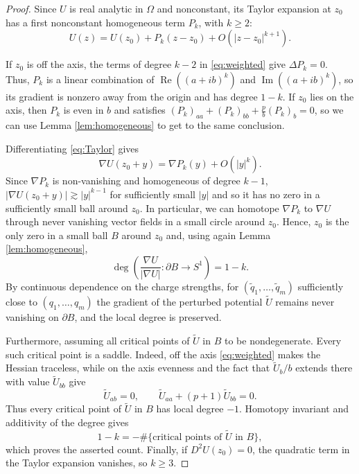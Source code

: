 \documentclass[leqno,11pt]{amsart}
\numberwithin{equation}{section}
\DeclareMathOperator\degmap{deg}
\theoremstyle{definition}
\begin{document}
	\begin{proof}
		Since $U$ is real analytic in $\Omega$ and nonconstant, its Taylor expansion at $z_0$ has a first nonconstant homogeneous term $P_k$, with $k\geq2$:
		\begin{equation}\label{eq:Taylor}
			U(z)=U(z_0)+P_k(z-z_0)+O(|z-z_0|^{k+1}).
		\end{equation}
		
		If $z_0$ is off the axis, the terms of degree $k-2$ in \eqref{eq:weighted} give $\Delta P_k=0$. Thus, $P_k$ is a linear combination of $\operatorname{Re}((a+ib)^k)$ and $\operatorname{Im}((a+ib)^k)$, so its gradient is nonzero away from the origin and has degree $1-k$. If $z_0$ lies on the axis, then $P_k$ is even in $b$ and satisfies $(P_k)_{aa}+(P_k)_{bb}+\frac{p}{b}(P_k)_b=0$, so we can use
		Lemma \ref{lem:homogeneous} to get to the same conclusion.
		
		Differentiating \eqref{eq:Taylor} gives
		\[
		\nabla U(z_0+y)=\nabla P_k(y)+O(|y|^k).
		\]
		Since $\nabla P_k$ is non-vanishing and homogeneous of degree $k-1$, $|\nabla U(z_0+y)|\gtrsim |y|^{k-1}$ for sufficiently small $|y|$ and so it has no zero in a sufficiently small ball around $z_0$. In particular, we can homotope $\nabla P_k$ to $\nabla U$ through never vanishing vector fields in a small circle around $z_0$. Hence, $z_0$ is the only zero in a small ball $B$ around $z_0$ and, using again Lemma \ref{lem:homogeneous},
		\[
		\degmap\left(\frac{\nabla U}{|\nabla U|}: \partial B \to S^1 \right)=1-k.
		\]
		By continuous dependence on the charge strengths, for $(\tilde q_1,\ldots, \tilde q_m)$ sufficiently close to $(q_1,\ldots,q_m)$ the gradient of the perturbed potential $\widetilde U$ remains never vanishing on $\partial B$, and the local degree is preserved.
		
		Furthermore, assuming all critical points of $\widetilde U$ in $B$ to be nondegenerate. Every such critical point is a saddle. Indeed, off the axis \eqref{eq:weighted} makes the Hessian traceless, while on the axis evenness and the fact that $\widetilde U_b/b$ extends there with value $\widetilde U_{bb}$ give
		\[
		\widetilde U_{ab}=0,
		\qquad
		\widetilde U_{aa}+(p+1)\widetilde U_{bb}=0.
		\]
		Thus every critical point of $\widetilde U$ in $B$ has local degree $-1$. Homotopy invariant and additivity of the degree gives
		\[
		1-k=-\#\{\text{critical points of }\widetilde U\text{ in }B\},
		\]
		which proves the asserted count. Finally, if $D^2U(z_0)=0$, the quadratic term in the Taylor expansion vanishes, so $k\geq3$.
	\end{proof}
	
\end{document}
